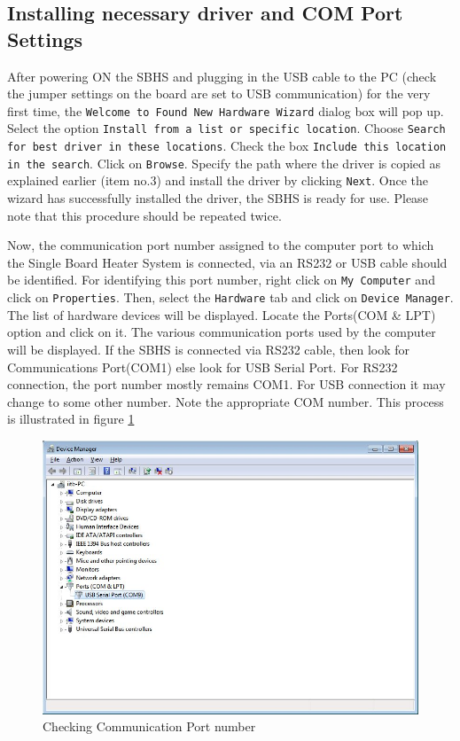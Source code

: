 \subsection{Installing necessary driver and COM Port Settings}\label{driver}
After powering ON the SBHS and plugging in the USB cable to the PC (check the jumper settings on the board are set to USB communication) for the very first time, the {\tt Welcome to Found New Hardware Wizard} dialog box will pop up. Select the option {\tt Install from a list or specific location}. Choose {\tt Search for best driver in these locations}. Check the box {\tt Include this location in the search}. Click on {\tt Browse}. Specify the path where the driver is copied as explained earlier (item no.3) and install the driver by clicking {\tt Next}. Once the wizard has successfully installed the driver, the SBHS is ready for use. Please note that this procedure should be repeated twice.

Now, the communication port number assigned to the computer port to which the Single Board Heater System is connected, via an RS232 or USB cable should be identified. For identifying this port number, right click on {\tt My Computer} and click on { \tt Properties}. Then, select the { \tt Hardware} tab and click on { \tt Device Manager}. The list of hardware devices will be displayed. Locate the Ports(COM \& LPT) option and click on it. The various communication ports used by the computer will be displayed. If the SBHS is connected via RS232 cable, then look for Communications Port(COM1) else look for USB Serial Port. For RS232 connection, the port number mostly remains COM1. For USB connection it may change to some other number. Note the appropriate COM number. This process is illustrated in figure \ref{com_number}
\begin{figure}
\centering
\includegraphics[width=0.7\linewidth]{using-sbhs/COM.jpg}
\caption{Checking Communication Port number}
\label{com_number}
\end{figure}

